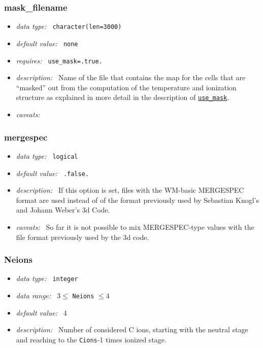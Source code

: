 \documentclass[a4paper,10pt]{article}
\begin{document}
\subsubsection{mask\_filename}
\label{opt:maskfilename}
\begin{itemize}
 \item \textit{data type:~} \texttt{character(len=3000)}
 \item \textit{default value:~} \texttt{none}
 \item \textit{requires:~} \texttt{use\_mask=.true.}
 \item \textit{description:~} Name of the file that contains the map for
 the cells that are ``masked'' out from the computation of the 
 temperature and ionization structure as  explained in more detail in the
 description of \texttt{\hyperref[opt:usemask]{use\_mask}}. 
 \item \textit{caveats:~} 
\end{itemize}


\subsubsection{mergespec}
\label{opt:mergespec}
\begin{itemize}
 \item \textit{data type:~} \texttt{logical}
 \item \textit{default value:~} \texttt{.false.}
 \item \textit{description:~} If this option is set, files with the WM-basic  
  MERGESPEC format are used instead of of the format previously used by 
  Sebastian Knogl's and Johann Weber's 3d Code. 
 \item \textit{caveats:~} So far it is not possible to mix MERGESPEC-type values with the
  file format previously used by the 3d code.
\end{itemize}


\subsubsection{Neions}
\label{opt:neions}
\begin{itemize}
 \item \textit{data type:~} \texttt{integer}
 \item \textit{data range:~}  $3 \leq$ \texttt{Neions} $\leq 4$ 
 \item \textit{default value:~} 4
 \item \textit{description:~} Number of considered C ions, starting with the 
 neutral stage and reaching to  the \texttt{Cions}-1 times ionized stage.
\end{itemize}
\end{document}
